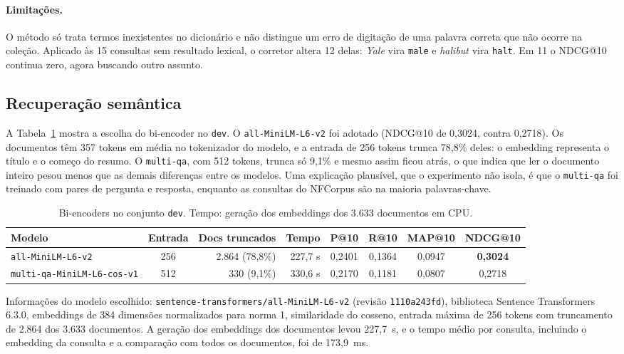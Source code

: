 \documentclass[11pt,a4paper]{article}
\newcommand{\cod}[1]{\texttt{#1}}
\begin{document}
\paragraph{Limitações.} O método só trata termos inexistentes no dicionário e não distingue um erro de digitação de uma palavra correta que não ocorre na coleção. Aplicado às 15 consultas sem resultado lexical, o corretor altera 12 delas: \emph{Yale} vira \cod{male} e \emph{halibut} vira \cod{halt}. Em 11 o NDCG@10 continua zero, agora buscando outro assunto.

\FloatBarrier
\subsection{Recuperação semântica}

A Tabela~\ref{tab:bienc} mostra a escolha do bi-encoder no \cod{dev}. O \cod{all-MiniLM-L6-v2} foi adotado (NDCG@10 de 0,3024, contra 0,2718). Os documentos têm 357 tokens em média no tokenizador do modelo, e a entrada de 256 tokens trunca 78,8\% deles: o embedding representa o título e o começo do resumo. O \cod{multi-qa}, com 512 tokens, trunca só 9,1\% e mesmo assim ficou atrás, o que indica que ler o documento inteiro pesou menos que as demais diferenças entre os modelos. Uma explicação plausível, que o experimento não isola, é que o \cod{multi-qa} foi treinado com pares de pergunta e resposta, enquanto as consultas do NFCorpus são na maioria palavras-chave.

\begin{table}[!htb]
\centering\footnotesize
\setlength{\tabcolsep}{4pt}
\caption{Bi-encoders no conjunto \cod{dev}. Tempo: geração dos embeddings dos 3.633 documentos em CPU.}
\label{tab:bienc}
\begin{tabular}{lcrrcccc}
\toprule
Modelo & Entrada & Docs truncados & Tempo & P@10 & R@10 & MAP@10 & NDCG@10 \\
\midrule
\cod{all-MiniLM-L6-v2} & 256 & 2.864 (78,8\%) & 227,7 s & 0,2401 & 0,1364 & 0,0947 & \textbf{0,3024} \\
\cod{multi-qa-MiniLM-L6-cos-v1} & 512 & 330 (9,1\%) & 330,6 s & 0,2170 & 0,1181 & 0,0807 & 0,2718 \\
\bottomrule
\end{tabular}
\end{table}

Informações do modelo escolhido: \cod{sentence-transformers/all-MiniLM-L6-v2} (revisão \cod{1110a243fd}), biblioteca Sentence Transformers 6.3.0, embeddings de 384 dimensões normalizados para norma 1, similaridade do cosseno, entrada máxima de 256 tokens com truncamento de 2.864 dos 3.633 documentos. A geração dos embeddings dos documentos levou 227,7~s, e o tempo médio por consulta, incluindo o embedding da consulta e a comparação com todos os documentos, foi de 173,9~ms.
\end{document}
